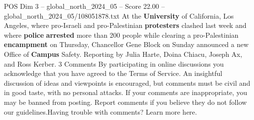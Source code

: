 \begin{textsample}{POS Dim 3 – global\_north\_2024\_05 – Score 22.00 – global\_north\_2024\_05/108051878.txt}
At the \textbf{University} of California, Los Angeles, where pro-Israeli and pro-Palestinian \textbf{protesters} clashed last week and where \textbf{police} \textbf{arrested} more than 200 people while clearing a pro-Palestinian \textbf{encampment} on Thursday, Chancellor Gene Block on Sunday announced a new Office of \textbf{Campus} Safety.
Reporting by Julia Harte, Doina Chiacu, Joseph Ax, and Ross Kerber. 3 Comments By participating in online discussions you acknowledge that you have agreed to the Terms of Service.
An insightful discussion of ideas and viewpoints is encouraged, but comments must be civil and in good taste, with no personal attacks.
If your comments are inappropriate, you may be banned from posting.
Report comments if you believe they do not follow our guidelines.Having trouble with comments?
Learn more here.

\end{textsample}
